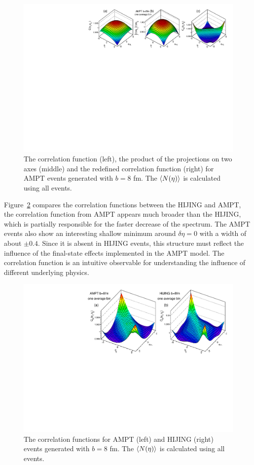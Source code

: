 \begin{figure}[H]
\centering
\includegraphics[width=.95\linewidth]{figs/chapter_fbcorr/Model_corr_SPM.pdf}
\caption{The correlation function (left), the product of the projections on two axes (middle) and the redefined correlation function (right) for AMPT events generated with $b=8$ fm. The $\left\langle N(\eta)\right\rangle$ is calculated using all events.}
\label{fig:fbcorr_Model_corr_SPM}
\end{figure}

Figure~\ref{fig:fbcorr_Model_corr_modelComp} compares the correlation functions between the HIJING and AMPT, the correlation function from AMPT appears much broader than the HIJING, which is partially responsible for the faster decrease of the spectrum. The AMPT events also show an interesting shallow minimum around $\delta\eta=0$ with a width of about $\pm 0.4$. Since it is absent in HIJING events, this structure must reflect the influence of the final-state effects implemented in the AMPT model. The correlation function is an intuitive observable for understanding the influence of different underlying physics.

\begin{figure}[H]
\centering
\includegraphics[width=.95\linewidth]{figs/chapter_fbcorr/Model_corr_modelComp.pdf}
\caption{The correlation functions for AMPT (left) and HIJING (right) events generated with $b=8$ fm. The $\left\langle N(\eta)\right\rangle$ is calculated using all events.}
\label{fig:fbcorr_Model_corr_modelComp}
\end{figure}

